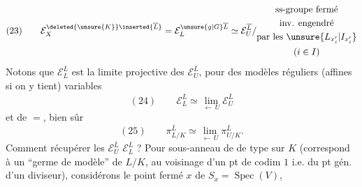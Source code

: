 \[
(23)\qquad
\mathcal E_X^{\deleted{\unsure{K}}\inserted{\overline L}}
=\mathcal E_L^{\unsure{g|G}\overline L}
\simeq\mathcal E_U^{\overline L}/\begin{gathered}\text{ss-groupe fermé}\\\text{inv. engendré}\\\text{par les }\unsure{L_{x_i'}|I_{x_i'}}\\(i\in I)\end{gathered}
\]
Notons que $\mathcal E_L^{\overline L}$ est la limite projective des $\mathcal E_U^{\overline L}$, pour des modèles réguliers (affines si on y tient) variables
\[
(24)\qquad\mathcal E_L^{\overline L}\simeq\lim_{\longleftarrow\,U}\mathcal E_U^{\overline L}
\]
et de $=$, bien sûr
\[
(25)\qquad\pi_{L/K}^{\overline L}\simeq\lim_{\longleftarrow\,U}\pi_{U/K}^{\overline L}.
\]
Comment récupérer les $\mathcal E_U^{\overline L}$  $\mathcal E_L^{\overline L}$ ? Pour \uline{} sous-anneau  de  de type  sur $K$ (correspond à un ``germe de modèle'' de $L/K$, au voisinage d'un pt de codim $1$ i.e. du pt gén. d'un diviseur), considérons le point fermé $x$ de $S_x=\operatorname{Spec}(V)$,
